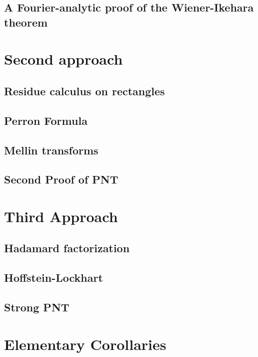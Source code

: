 \section{A Fourier-analytic proof of the Wiener-Ikehara theorem}


\chapter{Second approach}

\section{Residue calculus on rectangles}




\section{Perron Formula}


\section{Mellin transforms}


\section{Second Proof of PNT}



\chapter{Third Approach}

\section{Hadamard factorization}


\section{Hoffstein-Lockhart}


\section{Strong PNT}


\chapter{Elementary Corollaries}





